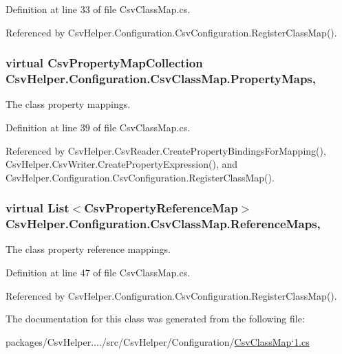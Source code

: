 Definition at line 33 of file Csv\-Class\-Map.\-cs.



Referenced by Csv\-Helper.\-Configuration.\-Csv\-Configuration.\-Register\-Class\-Map().

\hypertarget{a00057_a9580e897abcba144f3101eb983348e25}{
\subsubsection[{Property\-Maps}]{\setlength{\rightskip}{0pt plus 5cm}virtual {\bf Csv\-Property\-Map\-Collection} Csv\-Helper.\-Configuration.\-Csv\-Class\-Map.\-Property\-Maps\hspace{0.3cm}{\ttfamily [get]}, {\ttfamily [inherited]}}}\label{a00057_a9580e897abcba144f3101eb983348e25}


The class property mappings. 



Definition at line 39 of file Csv\-Class\-Map.\-cs.



Referenced by Csv\-Helper.\-Csv\-Reader.\-Create\-Property\-Bindings\-For\-Mapping(), Csv\-Helper.\-Csv\-Writer.\-Create\-Property\-Expression(), and Csv\-Helper.\-Configuration.\-Csv\-Configuration.\-Register\-Class\-Map().

\hypertarget{a00057_a6dfbf8f743b16d2ec83edef865ea2d9e}{
\subsubsection[{Reference\-Maps}]{\setlength{\rightskip}{0pt plus 5cm}virtual List$<${\bf Csv\-Property\-Reference\-Map}$>$ Csv\-Helper.\-Configuration.\-Csv\-Class\-Map.\-Reference\-Maps\hspace{0.3cm}{\ttfamily [get]}, {\ttfamily [inherited]}}}\label{a00057_a6dfbf8f743b16d2ec83edef865ea2d9e}


The class property reference mappings. 



Definition at line 47 of file Csv\-Class\-Map.\-cs.



Referenced by Csv\-Helper.\-Configuration.\-Csv\-Configuration.\-Register\-Class\-Map().



The documentation for this class was generated from the following file\-:\begin{DoxyCompactItemize}
\item 
packages/\-Csv\-Helper..../src/\-Csv\-Helper/\-Configuration/\hyperlink{a00196}{Csv\-Class\-Map`1.\-cs}\end{DoxyCompactItemize}
